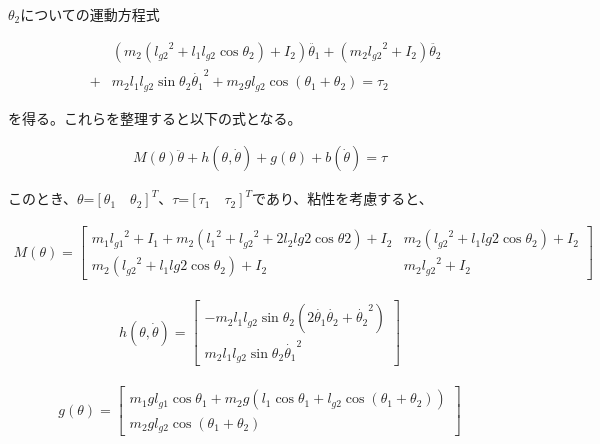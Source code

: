 $\theta_{2}$についての運動方程式

\begin{eqnarray}
  &&(m_{2}({l_{g2}}^2 + l_{1}l_{g2}\cos\theta_{2}) + I_{2})\ddot{\theta_{1}} + (m_{2}{l_{g2}}^2 + I_{2})\ddot{\theta_{2}} \nonumber \\
  &+& m_{2}l_{1}l_{g2}\sin\theta_{2}{\dot{\theta_{1}}}^2 + m_{2}gl_{g2}\cos(\theta_{1} + \theta_{2}) = \tau_{2}
\end{eqnarray}

を得る。これらを整理すると以下の式となる。

\begin{eqnarray}
  M(\theta)\ddot{\theta} + h(\theta, \dot{\theta}) + g(\theta) + b(\dot{\theta}) = \tau
\end{eqnarray}

このとき、$\theta$=${[\theta_{1} \quad \theta_{2}]}^T$、$\tau$=${[\tau_{1} \quad \tau_{2}]}^T$であり、粘性を考慮すると、

\begin{align}
  M(\theta)= 
            \begin{bmatrix}
              m_{1}{l_{g1}}^2 + I_{1} + m_{2}({l_{1}}^2 + {l_{g2}}^2 + 2l_{2}l{g2}\cos\theta{2}) + I_{2} & m_{2}({l_{g2}}^2 + l_{1}l{g2}\cos\theta_{2}) + I_{2} \\
              m_{2}({l_{g2}}^2 + l_{1}l{g2}\cos\theta_{2}) + I_{2} & m_{2}{l_{g2}}^2 + I_{2}
            \end{bmatrix}
\end{align}

\begin{eqnarray}
  h(\theta, \dot{\theta})=
            \begin{bmatrix}
              -m_{2}l_{1}l_{g2}\sin\theta_{2}(2\dot{\theta_{1}}\dot{\theta_{2}} + {\dot{\theta_{2}}}^2) \\
              m_{2}l_{1}l_{g2}\sin\theta_{2}{\dot{\theta_{1}}}^2
            \end{bmatrix}
\end{eqnarray}

\begin{eqnarray}
  g(\theta)=
            \begin{bmatrix}
              m_{1}gl_{g1}\cos\theta_{1} + m_{2}g(l_{1}\cos\theta_{1} + l_{g2}\cos(\theta_{1} + \theta_{2})) \\
              m_{2}gl_{g2}\cos(\theta_{1} + \theta_{2})
            \end{bmatrix}
\end{eqnarray}

